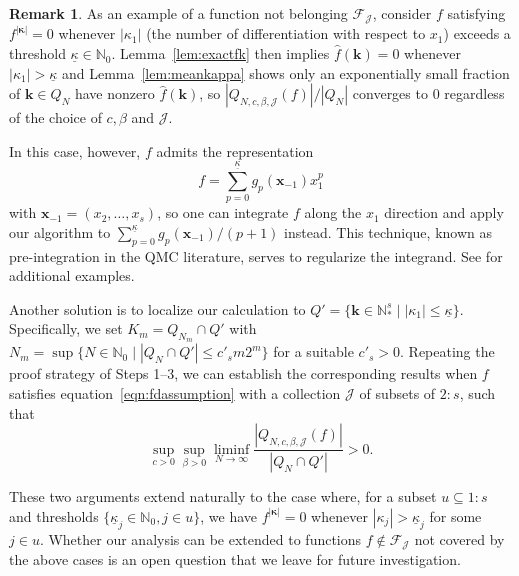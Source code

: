 \documentclass{article}
\theoremstyle{definition}
\newtheorem{remark}{Remark}
\renewcommand{\le}{\leqslant}
\renewcommand{\leq}{\leqslant}
\newcommand{\cj}{\mathcal{J}}
\newcommand{\natu}{\mathbb{N}}
\newcommand{\bsk}{\boldsymbol{k}}
\newcommand{\bsx}{\boldsymbol{x}}
\newcommand{\bskappa}{\boldsymbol{\kappa}}
\begin{document}
\begin{remark}\label{remark:assump}
As an example of a function not belonging $\mathcal{F}_{\cj}$, consider $f$ satisfying $f^{|\bskappa|}=0$ whenever $|\kappa_1|$ (the number of differentiation with respect to $x_1$) exceeds a threshold $\underline{\kappa}\in\natu_0$. Lemma~\ref{lem:exactfk} then implies $\hat{f}(\bsk)=0$ whenever $|\kappa_1|>\underline{\kappa}$ and Lemma~\ref{lem:meankappa} shows only an exponentially small fraction of $\bsk\in Q_N$ have nonzero $\hat{f}(\bsk)$, so $|Q_{N,c,\beta,\cj}(f)|/|Q_{N}|$ converges to $0$ regardless of the choice of $c,\beta$ and $\cj$.

In this case, however, $f$ admits the representation
$$f=\sum_{p=0}^{\underline{\kappa}}g_p(\bsx_{-1})x_1^p$$
with $\bsx_{-1}=(x_2,\dots,x_s)$, so one can integrate $f$ along the $x_1$ direction and apply our algorithm to $\sum_{p=0}^{\underline{\kappa}}g_p(\bsx_{-1})/(p+1)$ instead. This technique, known as pre-integration in the QMC literature, serves to regularize the integrand. See \cite{grie:kuo:leov:sloa:2018, Sifan:2023} for additional examples.

Another solution is to localize our calculation to $Q'=\{\bsk\in \natu_*^s\mid  |\kappa_1| \leq  \underline{\kappa}\}$. Specifically, we set $K_m=Q_{N_m}\cap Q'$ with $N_m=\sup \{N\in \natu_0\mid |Q_N \cap Q'|\le c'_s m 2^m \}$ for a suitable  $c'_s>0$. Repeating the proof strategy of Steps 1–3, we can establish the corresponding results when $f$ satisfies equation~\eqref{eqn:fdassumption} with a collection $\cj$ of subsets of $2{:}s$, such that
\begin{equation*}
\sup_{c>0}\sup_{\beta>0}\liminf_{N\to\infty}\frac{|Q_{N,c,\beta,\cj}(f)|}{|Q_{N}\cap Q'|} >0.
    \end{equation*}

    These two arguments extend naturally to the case where, for a subset $u\subseteq 1{:}s$ and thresholds $\{\underline{\kappa}_j\in\natu_0, j\in u\}$,  we have $f^{|\bskappa|}=0$ whenever $|\kappa_j|> \underline{\kappa}_j$ for some $j\in u$. Whether our analysis can be extended to functions $f\notin\mathcal{F}_{\cj}$ not covered by the above cases is an open question that we leave for future investigation.
\end{remark}
\end{document}
